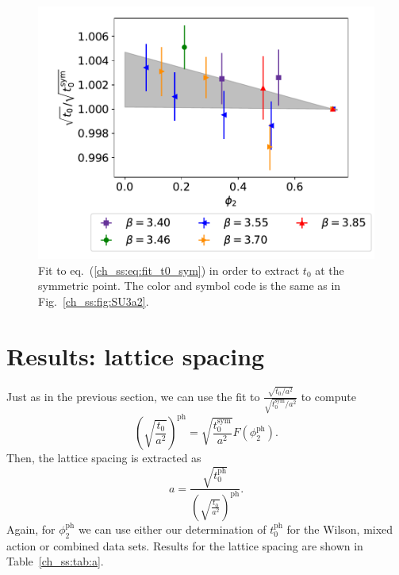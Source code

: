 {\begin{figure}
    \centering
    \includegraphics[width=1.\textwidth]{./cap5/figs/t0_sym.pdf}
    \caption{Fit to eq.~(\ref{ch_ss:eq:fit_t0_sym}) in order to extract $t_0$ at the symmetric point. The color and symbol code is the same as in Fig.~\ref{ch_ss:fig:SU3a2}.}
    \label{ch_ss:fig:t0_sym}
\end{figure}

\section{Results: lattice spacing}
\label{ch_ss:sec:t0_sym}

Just as in the previous section, we can use the fit to $\frac{\sqrt{t_0/a^2}}{\sqrt{t_0^{\textrm{sym}}/a^2}}$ to compute 
\begin{equation}
\left(\sqrt{\frac{t_0}{a^2}}\right)^{\textrm{ph}}=\sqrt{\frac{t_0^{\textrm{sym}}}{a^2}}F(\phi_2^{\textrm{ph}}).
\end{equation}
Then, the lattice spacing is extracted as
\begin{equation}
\label{ch_ss:eq:a}
a=\frac{\sqrt{t_0^{\textrm{ph}}}}{\left(\sqrt{\frac{t_0}{a^2}}\right)^{\textrm{ph}}}.
\end{equation}
Again, for $\phi_2^{\textrm{ph}}$ we can use either our determination of $t_0^{\textrm{ph}}$ for the Wilson, mixed action or combined data sets. Results for the lattice spacing are shown in Table~\ref{ch_ss:tab:a}.

}
